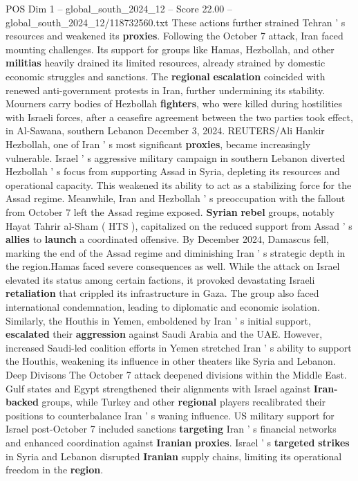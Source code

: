 \begin{textsample}{POS Dim 1 – global\_south\_2024\_12 – Score 22.00 – global\_south\_2024\_12/118732560.txt}
These actions further strained Tehran ' s resources and weakened its \textbf{proxies}.
Following the October 7 attack, Iran faced mounting challenges.
Its support for groups like Hamas, Hezbollah, and other \textbf{militias} heavily drained its limited resources, already strained by domestic economic struggles and sanctions.
The \textbf{regional} \textbf{escalation} coincided with renewed anti-government protests in Iran, further undermining its stability.
Mourners carry bodies of Hezbollah \textbf{fighters}, who were killed during hostilities with Israeli forces, after a ceasefire agreement between the two parties took effect, in Al-Sawana, southern Lebanon December 3, 2024.
REUTERS/Ali Hankir Hezbollah, one of Iran ' s most significant \textbf{proxies}, became increasingly vulnerable.
Israel ' s aggressive military campaign in southern Lebanon diverted Hezbollah ' s focus from supporting Assad in Syria, depleting its resources and operational capacity.
This weakened its ability to act as a stabilizing force for the Assad regime.
Meanwhile, Iran and Hezbollah ' s preoccupation with the fallout from October 7 left the Assad regime exposed. \textbf{Syrian} \textbf{rebel} groups, notably Hayat Tahrir al-Sham ( HTS ), capitalized on the reduced support from Assad ' s \textbf{allies} to \textbf{launch} a coordinated offensive.
By December 2024, Damascus fell, marking the end of the Assad regime and diminishing Iran ' s strategic depth in the region.Hamas faced severe consequences as well.
While the attack on Israel elevated its status among certain factions, it provoked devastating Israeli \textbf{retaliation} that crippled its infrastructure in Gaza.
The group also faced international condemnation, leading to diplomatic and economic isolation.
Similarly, the Houthis in Yemen, emboldened by Iran ' s initial support, \textbf{escalated} their \textbf{aggression} against Saudi Arabia and the UAE.
However, increased Saudi-led coalition efforts in Yemen stretched Iran ' s ability to support the Houthis, weakening its influence in other theaters like Syria and Lebanon.
Deep Divisons The October 7 attack deepened divisions within the Middle East.
Gulf states and Egypt strengthened their alignments with Israel against \textbf{Iran-backed} groups, while Turkey and other \textbf{regional} players recalibrated their positions to counterbalance Iran ' s waning influence.
US military support for Israel post-October 7 included sanctions \textbf{targeting} Iran ' s financial networks and enhanced coordination against \textbf{Iranian} \textbf{proxies}.
Israel ' s \textbf{targeted} \textbf{strikes} in Syria and Lebanon disrupted \textbf{Iranian} supply chains, limiting its operational freedom in the \textbf{region}.

\end{textsample}
